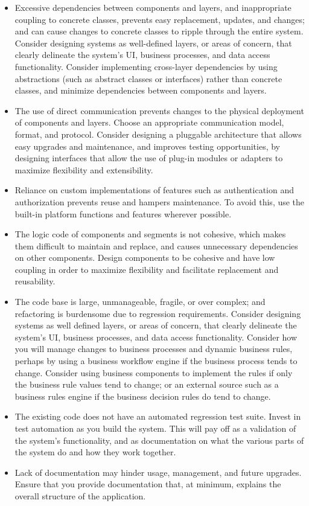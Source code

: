 \documentclass[../Psychological_system_web_application.tex]{subfiles}
\begin{document}
				\begin{itemize}
					\item
						Excessive dependencies between components and layers, and inappropriate coupling to concrete classes, prevents easy replacement, updates, and changes; and can cause changes to concrete classes to ripple through the entire system. Consider designing systems as well-defined layers, or areas of concern, that clearly delineate the system’s UI, business processes, and data access functionality. Consider implementing cross-layer dependencies by using abstractions (such as abstract classes or interfaces) rather than concrete classes, and minimize dependencies between components and layers.
					\item
						The use of direct communication prevents changes to the physical deployment of components and layers. Choose an appropriate communication model, format, and protocol. Consider designing a pluggable architecture that allows easy upgrades and maintenance, and improves testing opportunities, by designing interfaces that allow the use of plug-in modules or adapters to maximize flexibility and extensibility.
					\item
						Reliance on custom implementations of features such as authentication and authorization prevents reuse and hampers maintenance. To avoid this, use the built-in platform functions and features wherever possible.
					\item
						The logic code of components and segments is not cohesive, which makes them difficult to maintain and replace, and causes unnecessary dependencies on other components. Design components to be cohesive and have low coupling in order to maximize flexibility and facilitate replacement and reusability.
					\item
						The code base is large, unmanageable, fragile, or over complex; and refactoring is burdensome due to regression requirements. Consider designing systems as well defined layers, or areas of concern, that clearly delineate the system’s UI, business processes, and data access functionality. Consider how you will manage changes to business processes and dynamic business rules, perhaps by using a business workflow engine if the business process tends to change. Consider using business components to implement the rules if only the business rule values tend to change; or an external source such as a business rules engine if the business decision rules do tend to change.
					\item
						The existing code does not have an automated regression test suite. Invest in test automation as you build the system. This will pay off as a validation of the system’s functionality, and as documentation on what the various parts of the system do and how they work together.
					\item
						Lack of documentation may hinder usage, management, and future upgrades. Ensure that you provide documentation that, at minimum, explains the overall structure of the application.
				\end{itemize}
			
\end{document}
